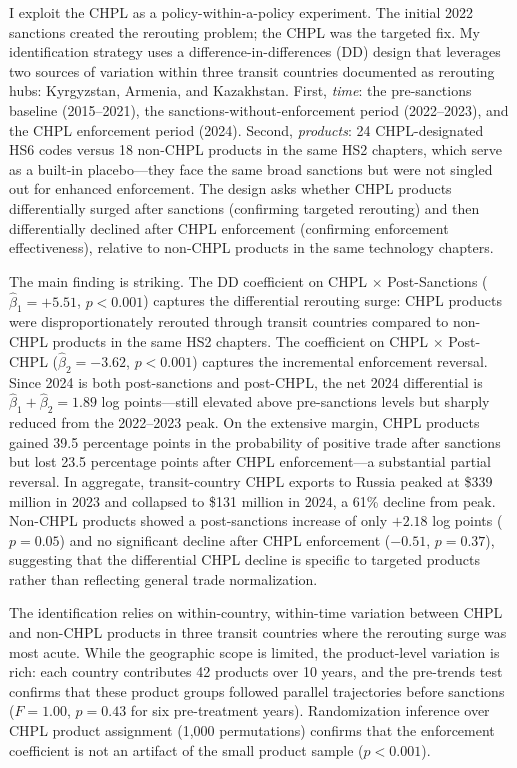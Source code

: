 \documentclass[12pt]{article}
\begin{document}
I exploit the CHPL as a policy-within-a-policy experiment. The initial 2022 sanctions created the rerouting problem; the CHPL was the targeted fix. My identification strategy uses a difference-in-differences (DD) design that leverages two sources of variation within three transit countries documented as rerouting hubs: Kyrgyzstan, Armenia, and Kazakhstan. First, \textit{time}: the pre-sanctions baseline (2015--2021), the sanctions-without-enforcement period (2022--2023), and the CHPL enforcement period (2024). Second, \textit{products}: 24 CHPL-designated HS6 codes versus 18 non-CHPL products in the same HS2 chapters, which serve as a built-in placebo---they face the same broad sanctions but were not singled out for enhanced enforcement. The design asks whether CHPL products differentially surged after sanctions (confirming targeted rerouting) and then differentially declined after CHPL enforcement (confirming enforcement effectiveness), relative to non-CHPL products in the same technology chapters.

The main finding is striking. The DD coefficient on CHPL $\times$ Post-Sanctions ($\hat{\beta}_1 = +5.51$, $p < 0.001$) captures the differential rerouting surge: CHPL products were disproportionately rerouted through transit countries compared to non-CHPL products in the same HS2 chapters. The coefficient on CHPL $\times$ Post-CHPL ($\hat{\beta}_2 = -3.62$, $p < 0.001$) captures the incremental enforcement reversal. Since 2024 is both post-sanctions and post-CHPL, the net 2024 differential is $\hat{\beta}_1 + \hat{\beta}_2 = 1.89$ log points---still elevated above pre-sanctions levels but sharply reduced from the 2022--2023 peak. On the extensive margin, CHPL products gained 39.5 percentage points in the probability of positive trade after sanctions but lost 23.5 percentage points after CHPL enforcement---a substantial partial reversal. In aggregate, transit-country CHPL exports to Russia peaked at \$339 million in 2023 and collapsed to \$131 million in 2024, a 61\% decline from peak. Non-CHPL products showed a post-sanctions increase of only $+2.18$ log points ($p = 0.05$) and no significant decline after CHPL enforcement ($-0.51$, $p = 0.37$), suggesting that the differential CHPL decline is specific to targeted products rather than reflecting general trade normalization.

The identification relies on within-country, within-time variation between CHPL and non-CHPL products in three transit countries where the rerouting surge was most acute. While the geographic scope is limited, the product-level variation is rich: each country contributes 42 products over 10 years, and the pre-trends test confirms that these product groups followed parallel trajectories before sanctions ($F = 1.00$, $p = 0.43$ for six pre-treatment years). Randomization inference over CHPL product assignment (1,000 permutations) confirms that the enforcement coefficient is not an artifact of the small product sample ($p < 0.001$).
\end{document}
